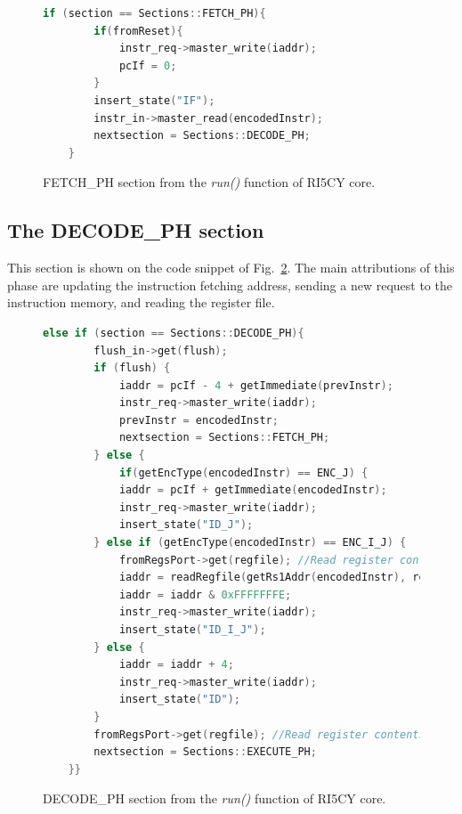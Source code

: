 \begin{figure}[htb!]
    \begin{lstlisting}[language=c++]
    if (section == Sections::FETCH_PH){
        if(fromReset){
            instr_req->master_write(iaddr);
            pcIf = 0;
        }
        insert_state("IF");
        instr_in->master_read(encodedInstr);
        nextsection = Sections::DECODE_PH;
    }\end{lstlisting}
    \caption{FETCH\_PH section from the \textit{run()} function of RI5CY core.}
    \label{fig:ri5cy-fetch-ph}
\end{figure}

\subsection*{The DECODE\_PH section}

This section is shown on the code snippet of Fig.~\ref{fig:ri5cy-decode-ph}. The main attributions of this phase are updating the instruction fetching address, sending a new request to the instruction memory, and reading the register file. 

\begin{figure}[htb!]
    \begin{lstlisting}[language=c++]
    else if (section == Sections::DECODE_PH){
        flush_in->get(flush);
        if (flush) {
            iaddr = pcIf - 4 + getImmediate(prevInstr);
            instr_req->master_write(iaddr);
            prevInstr = encodedInstr;
            nextsection = Sections::FETCH_PH;
        } else {
            if(getEncType(encodedInstr) == ENC_J) {
            iaddr = pcIf + getImmediate(encodedInstr);
            instr_req->master_write(iaddr);
            insert_state("ID_J");
        } else if (getEncType(encodedInstr) == ENC_I_J) {
            fromRegsPort->get(regfile); //Read register contents
            iaddr = readRegfile(getRs1Addr(encodedInstr), regfile) + getImmediate(encodedInstr);
            iaddr = iaddr & 0xFFFFFFFE;
            instr_req->master_write(iaddr);
            insert_state("ID_I_J");
        } else {
            iaddr = iaddr + 4;
            instr_req->master_write(iaddr);
            insert_state("ID");
        }
        fromRegsPort->get(regfile); //Read register contents
        nextsection = Sections::EXECUTE_PH;
    }}\end{lstlisting}
    \caption{DECODE\_PH section from the \textit{run()} function of RI5CY core.}
    \label{fig:ri5cy-decode-ph}
\end{figure}

